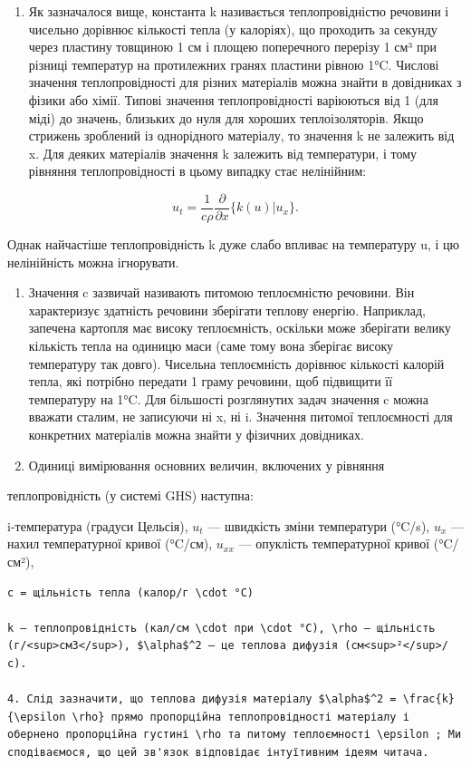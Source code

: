 \documentclass[
  ukrainian,
]{article}
\providecommand{\tightlist}{%
  \setlength{\itemsep}{0pt}\setlength{\parskip}{0pt}}
\begin{document}
\begin{enumerate}
\def\labelenumi{\arabic{enumi}.}
\tightlist
\item
  Як зазначалося вище, константа k називається теплопровідністю речовини
  і чисельно дорівнює кількості тепла (у калоріях), що проходить за
  секунду через пластину товщиною 1 см і площею поперечного перерізу 1
  см³ при різниці температур на протилежних гранях пластини рівною 1°C.
  Числові значення теплопровідності для різних матеріалів можна знайти в
  довідниках з фізики або хімії. Типові значення теплопровідності
  варіюються від 1 (для міді) до значень, близьких до нуля для хороших
  теплоізоляторів. Якщо стрижень зроблений із однорідного матеріалу, то
  значення k не залежить від x. Для деяких матеріалів значення k
  залежить від температури, і тому рівняння теплопровідності в цьому
  випадку стає нелінійним:
\end{enumerate}

\[
u_{t} = \frac{1}{c\rho} \frac{\partial}{\partial x} \{ k (u) | u_{x} \}.
\]

Однак найчастіше теплопровідність k дуже слабо впливає на температуру u,
і цю нелінійність можна ігнорувати.

\begin{enumerate}
\def\labelenumi{\arabic{enumi}.}
\setcounter{enumi}{1}
\item
  Значення c зазвичай називають питомою теплоємністю речовини. Він
  характеризує здатність речовини зберігати теплову енергію. Наприклад,
  запечена картопля має високу теплоємність, оскільки може зберігати
  велику кількість тепла на одиницю маси (саме тому вона зберігає високу
  температуру так довго). Чисельна теплоємність дорівнює кількості
  калорій тепла, які потрібно передати 1 граму речовини, щоб підвищити
  її температуру на 1°C. Для більшості розглянутих задач значення c
  можна вважати сталим, не записуючи ні x, ні i. Значення питомої
  теплоємності для конкретних матеріалів можна знайти у фізичних
  довідниках.
\item
  Одиниці вимірювання основних величин, включених у рівняння
\end{enumerate}

теплопровідність (у системі GHS) наступна:

i-температура (градуси Цельсія), \(u_t\) --- швидкість зміни температури
(°C/s), \(u_x\) --- нахил температурної кривої (°C/см), \(u_{xx}\) ---
опуклість температурної кривої (°C/см²),

\begin{verbatim}
c = щільність тепла (калор/г \cdot °C)

k — теплопровідність (кал/см \cdot при \cdot °C), \rho — щільність (г/<sup>см3</sup>), $\alpha$^2 — це теплова дифузія (см<sup>²</sup>/с).

4. Слід зазначити, що теплова дифузія матеріалу $\alpha$^2 = \frac{k}{\epsilon \rho} прямо пропорційна теплопровідності матеріалу і обернено пропорційна густині \rho та питому теплоємності \epsilon ; Ми сподіваємося, що цей зв'язок відповідає інтуїтивним ідеям читача.
\end{verbatim}
\end{document}
